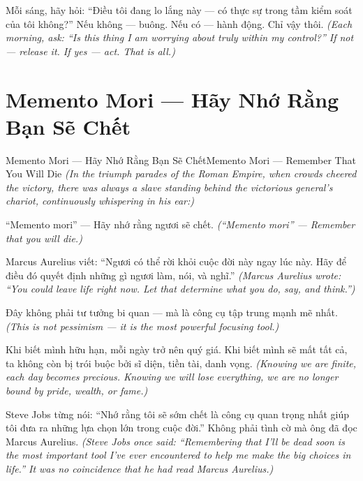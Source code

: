 \begin{baihoc}
Mỗi sáng, hãy hỏi: ``Điều tôi đang lo lắng này — có thực sự trong tầm kiểm soát của tôi không?'' Nếu không — buông. Nếu có — hành động. Chỉ vậy thôi.
\textit{(Each morning, ask: ``Is this thing I am worrying about truly within my control?'' If not — release it. If yes — act. That is all.)}
\end{baihoc}
\ngancach

\section{Memento Mori — Hãy Nhớ Rằng Bạn Sẽ Chết}
\begin{truyen}{Memento Mori — Hãy Nhớ Rằng Bạn Sẽ Chết}{Memento Mori — Remember That You Will Die}
\textit{(In the triumph parades of the Roman Empire, when crowds cheered the victory, there was always a slave standing behind the victorious general's chariot, continuously whispering in his ear:)}

``Memento mori'' — Hãy nhớ rằng ngươi sẽ chết.
\textit{(``Memento mori'' — Remember that you will die.)}

Marcus Aurelius viết: ``Ngươi có thể rời khỏi cuộc đời này ngay lúc này. Hãy để điều đó quyết định những gì ngươi làm, nói, và nghĩ.''
\textit{(Marcus Aurelius wrote: ``You could leave life right now. Let that determine what you do, say, and think.'')}

Đây không phải tư tưởng bi quan — mà là công cụ tập trung mạnh mẽ nhất.
\textit{(This is not pessimism — it is the most powerful focusing tool.)}

Khi biết mình hữu hạn, mỗi ngày trở nên quý giá. Khi biết mình sẽ mất tất cả, ta không còn bị trói buộc bởi sĩ diện, tiền tài, danh vọng.
\textit{(Knowing we are finite, each day becomes precious. Knowing we will lose everything, we are no longer bound by pride, wealth, or fame.)}

Steve Jobs từng nói: ``Nhớ rằng tôi sẽ sớm chết là công cụ quan trọng nhất giúp tôi đưa ra những lựa chọn lớn trong cuộc đời.'' Không phải tình cờ mà ông đã đọc Marcus Aurelius.
\textit{(Steve Jobs once said: ``Remembering that I'll be dead soon is the most important tool I've ever encountered to help me make the big choices in life.'' It was no coincidence that he had read Marcus Aurelius.)}

\end{truyen}

